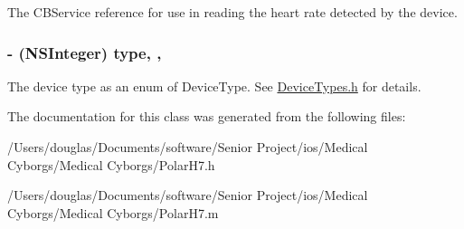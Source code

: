 The C\-B\-Service reference for use in reading the heart rate detected by the device. \hypertarget{interface_polar_h7_a3819e12cc9802bca0611683cdeaf5775}{
\subsubsection[{type}]{\setlength{\rightskip}{0pt plus 5cm}-\/ (N\-S\-Integer) type\hspace{0.3cm}{\ttfamily [read]}, {\ttfamily [write]}, {\ttfamily [atomic]}}}\label{interface_polar_h7_a3819e12cc9802bca0611683cdeaf5775}
The device type as an enum of Device\-Type. See \hyperlink{_device_types_8h_source}{Device\-Types.\-h} for details. 

The documentation for this class was generated from the following files\-:\begin{DoxyCompactItemize}
\item 
/\-Users/douglas/\-Documents/software/\-Senior Project/ios/\-Medical Cyborgs/\-Medical Cyborgs/Polar\-H7.\-h\item 
/\-Users/douglas/\-Documents/software/\-Senior Project/ios/\-Medical Cyborgs/\-Medical Cyborgs/Polar\-H7.\-m\end{DoxyCompactItemize}
